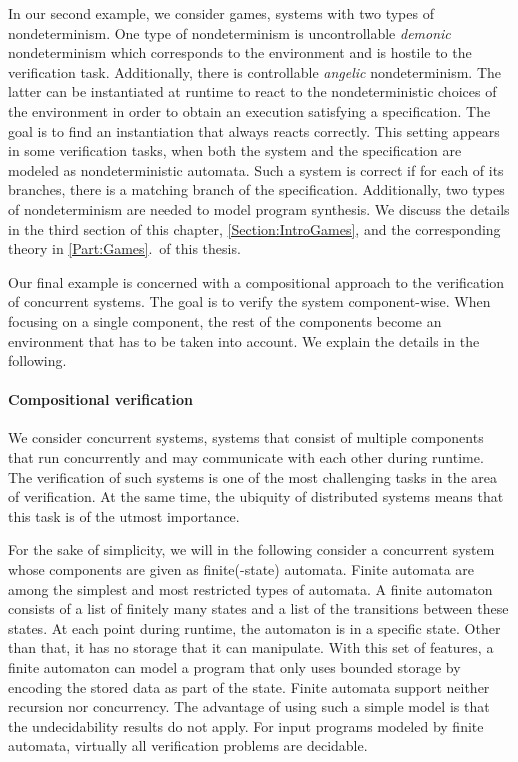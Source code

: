 \documentclass[../../diss.tex]{subfiles}
\begin{document}
In our second example, we consider games, \ie systems with two types of nondeterminism.
One type of nondeterminism is uncontrollable \emph{demonic} nondeterminism which corresponds to the environment and is hostile to the verification task.
Additionally, there is controllable \emph{angelic} nondeterminism.
The latter can be instantiated at runtime to react to the nondeterministic choices of the environment in order to obtain an execution satisfying a specification.
The goal is to find an instantiation that always reacts correctly.
This setting appears in some verification tasks, \eg when both the system and the specification are modeled as nondeterministic automata.
Such a system is correct if for each of its branches, there is a matching branch of the specification.
Additionally, two types of nondeterminism are needed to model program synthesis.
We discuss the details in the third section of this chapter, \cref{Section:IntroGames}, and the corresponding theory in \cref{Part:Games}.~of this thesis.

Our final example is concerned with a compositional approach to the verification of concurrent systems.
The goal is to verify the system component-wise.
When focusing on a single component, the rest of the components become an environment that has to be taken into account.
We explain the details in the following.

\paragraph{Compositional verification}

We consider concurrent systems, systems that consist of multiple components that run concurrently and may communicate with each other during runtime.
The verification of such systems is one of the most challenging tasks in the area of verification.
At the same time, the ubiquity of \eg distributed systems means that this task is of the utmost importance.

For the sake of simplicity, we will in the following consider a concurrent system whose components are given as finite(-state) automata.
Finite automata are among the simplest and most restricted types of automata.
A finite automaton consists of a list of finitely many states and a list of the transitions between these states.
At each point during runtime, the automaton is in a specific state.
Other than that, it has no storage that it can manipulate.
With this set of features, a finite automaton can model a program that only uses bounded storage by encoding the stored data as part of the state.
Finite automata support neither recursion nor concurrency.
The advantage of using such a simple model is that the undecidability results do not apply.
For input programs modeled by finite automata, virtually all verification problems are decidable.
\end{document}
